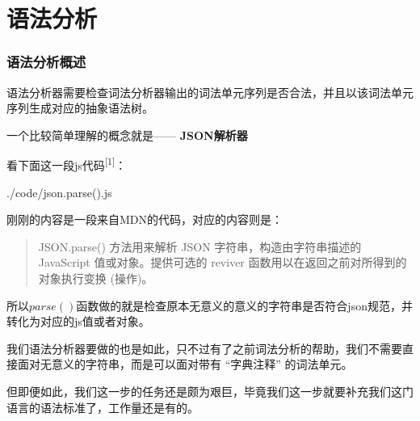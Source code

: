 \documentclass{beamer}
\begin{document}
    \section{语法分析}
	\begin{frame} 
		\frametitle{语法分析概述}
		
		语法分析器需要检查词法分析器输出的词法单元序列是否合法，并且以该词法单元序列生成对应的抽象语法树。
		
		一个比较简单理解的概念就是—— \textbf{JSON解析器}
		
		看下面这一段js代码\textsuperscript{[1]}：
		
		
		{./code/json.parse().js}
    \end{frame}
	\begin{frame}
		
		刚刚的内容是一段来自MDN的代码，对应的内容则是：
		
		\begin{quote}
			JSON.parse() 方法用来解析 JSON 字符串，构造由字符串描述的 JavaScript 值或对象。提供可选的 reviver 函数用以在返回之前对所得到的对象执行变换 (操作)。
		\end{quote}
	
		所以$parse()$函数做的就是检查原本无意义的意义的字符串是否符合json规范，并转化为对应的js值或者对象。
		
		
		我们语法分析器要做的也是如此，只不过有了之前词法分析的帮助，我们不需要直接面对无意义的字符串，而是可以面对带有 “字典注释” 的词法单元。
		
		但即便如此，我们这一步的任务还是颇为艰巨，毕竟我们这一步就要补充我们这门语言的语法标准了，工作量还是有的。
		
	\end{frame}
\end{document}
